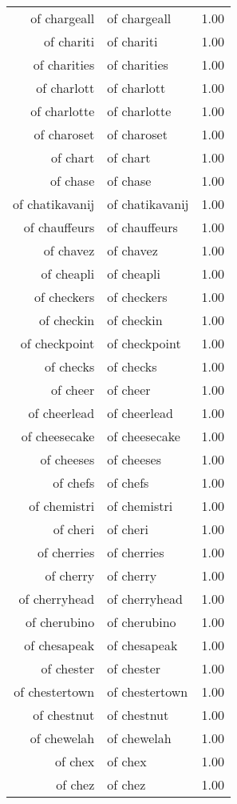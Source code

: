 \begin{table}[ht]
\begin{tabular}{rlr}
  of chargeall & of chargeall & 1.00 \\ 
  of chariti & of chariti & 1.00 \\ 
  of charities & of charities & 1.00 \\ 
  of charlott & of charlott & 1.00 \\ 
  of charlotte & of charlotte & 1.00 \\ 
  of charoset & of charoset & 1.00 \\ 
  of chart & of chart & 1.00 \\ 
  of chase & of chase & 1.00 \\ 
  of chatikavanij & of chatikavanij & 1.00 \\ 
  of chauffeurs & of chauffeurs & 1.00 \\ 
  of chavez & of chavez & 1.00 \\ 
  of cheapli & of cheapli & 1.00 \\ 
  of checkers & of checkers & 1.00 \\ 
  of checkin & of checkin & 1.00 \\ 
  of checkpoint & of checkpoint & 1.00 \\ 
  of checks & of checks & 1.00 \\ 
  of cheer & of cheer & 1.00 \\ 
  of cheerlead & of cheerlead & 1.00 \\ 
  of cheesecake & of cheesecake & 1.00 \\ 
  of cheeses & of cheeses & 1.00 \\ 
  of chefs & of chefs & 1.00 \\ 
  of chemistri & of chemistri & 1.00 \\ 
  of cheri & of cheri & 1.00 \\ 
  of cherries & of cherries & 1.00 \\ 
  of cherry & of cherry & 1.00 \\ 
  of cherryhead & of cherryhead & 1.00 \\ 
  of cherubino & of cherubino & 1.00 \\ 
  of chesapeak & of chesapeak & 1.00 \\ 
  of chester & of chester & 1.00 \\ 
  of chestertown & of chestertown & 1.00 \\ 
  of chestnut & of chestnut & 1.00 \\ 
  of chewelah & of chewelah & 1.00 \\ 
  of chex & of chex & 1.00 \\ 
  of chez & of chez & 1.00 \\ 

\end{tabular}
\end{table}
